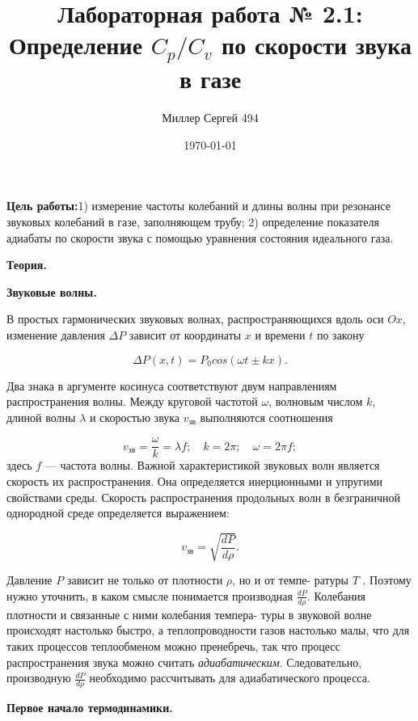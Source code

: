 \documentclass[10pt]{article}
\title{Лабораторная работа № 2.1:
    Определение $C_p/C_v$ по скорости звука в газе    
}
\date{\today}
\author{Миллер Сергей 494}
\begin{document}
    \maketitle
    \textbf{Цель работы:}1)  измерение частоты колебаний и длины волны при резонансе звуковых колебаний в газе, заполняющем трубу; 2) определение показателя адиабаты по скорости звука с помощью уравнения состояния идеального газа.

    \textbf{Теория.}

    \textbf{Звуковые волны.} 

    В простых гармонических звуковых волнах, распространяющихся вдоль оси $Ox$, изменение давления $\Delta P$ зависит от координаты $x$ и времени $t$ по закону

    \begin{equation}
        \Delta P(x,t) = P_0 cos(\omega t \pm kx).
    \end{equation}

    Два знака в аргументе косинуса соответствуют двум направлениям распространения волны. Между круговой частотой $\omega$, волновым числом $k$, длиной волны $\lambda$ и скоростью звука $v_\text{зв}$ выполняются соотношения

    \begin{equation}
        v_\text{зв} = \frac{\omega}{k} = \lambda f; \quad k = 2\pi; \quad \omega = 2\pi f;
    \end{equation}
    здесь $f$ — частота волны.
    Важной характеристикой звуковых волн является скорость их
    распространения. Она определяется инерционными и упругими свойствами среды. Скорость распространения продольных волн в безграничной однородной среде определяется выражением:
     
    \begin{equation}
        v_\text{зв} = \sqrt{\frac{dP}{d\rho}}.
    \end{equation}

    Давление $P$ зависит не только от плотности $\rho$, но и от темпе- ратуры $T$ . Поэтому нужно уточнить, в каком смысле понимается производная $\frac{dP}{d\rho}$.
    Колебания плотности и связанные с ними колебания темпера- туры в звуковой волне происходят настолько быстро, а теплопроводности газов настолько малы, что для таких процессов теплообменом можно пренебречь, так что процесс распространения звука можно считать \textit{адиабатическим}. Следовательно, производную $\frac{dP}{d\rho}$ необходимо рассчитывать для адиабатического процесса.


    \textbf{ Первое начало термодинамики.}
\end{document}
